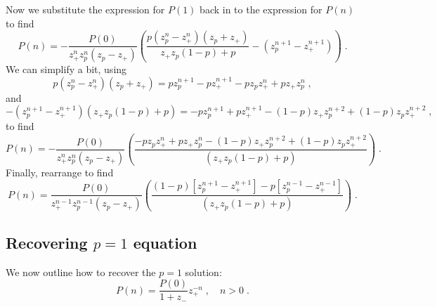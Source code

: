\documentclass[a4paper,10pt]{article}
\begin{document}
Now we substitute the expression for $P(1)$ back in to the expression for $P(n)$ to find
\begin{equation}
  P(n) = -\frac{P(0)}{z_+^n z_p^n(z_p-z_+)} \left( \frac{p(z_p^n-z_+^n)(z_p+z_+)}{z_+z_p(1-p) + p} -(z_p^{n+1} -z_+^{n+1}) \right) \;. 
\end{equation}
We can simplify a bit, using
\begin{equation}
 p(z_p^n-z_+^n)(z_p+z_+) = pz_p^{n+1} - pz_+^{n+1} -pz_pz_+^n + pz_+z_p^n \;, 
\end{equation}
and 
\begin{equation}
 -(z_p^{n+1} -z_+^{n+1}) (z_+z_p(1-p) + p) = -pz_p^{n+1} + pz_+^{n+1} - (1-p) z_+z_p^{n+2} + (1-p)z_pz_+^{n+2} \;,
\end{equation}
to find
\begin{equation}
  P(n) = -\frac{P(0)}{z_+^n z_p^n(z_p-z_+)} \left( \frac{-pz_pz_+^n + pz_+z_p^n - (1-p) z_+z_p^{n+2} + (1-p)z_pz_+^{n+2}}{(z_+z_p(1-p) + p)} \right) \;. 
\end{equation}
Finally, rearrange to find
\begin{equation}\label{eq:gen_soln}
  P(n) = \frac{P(0)}{z_+^{n-1} z_p^{n-1}(z_p-z_+)} \left( \frac{ (1-p) [z_p^{n+1} - z_+^{n+1}] - p[  z_p^{n-1} - z_+^{n-1}]}{(z_+z_p(1-p) + p)} \right) \;. 
\end{equation}

\subsection{Recovering $p=1$ equation}

We now outline how to recover the $p=1$ solution:
\begin{equation}
 P(n) = \frac{P(0)}{1+z_-} z_+^{-n} \;, \quad n > 0 \;.
\end{equation}
\end{document}
